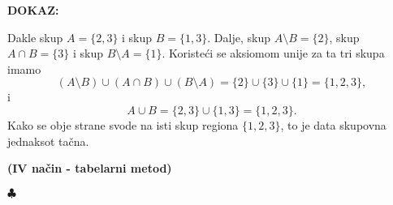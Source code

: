 \documentclass{article}
\newenvironment{dokaz}
    {\noindent\textbf{DOKAZ:}\\} {\hfill $\clubsuit$}
\begin{document}
\begin{dokaz}
    \begin{figure}[h]
         \hskip 2cm
        \end{figure}
    
    \noindent
    Dakle skup $A=\{2, 3\}$ i skup $B=\{1, 3\}$. Dalje, skup $A\setminus B=\{2\}$, skup $A\cap B=\{3\}$ i skup $B\setminus A=\{1\}$. Koristeći se aksiomom unije za ta tri skupa imamo
    $$(A\setminus B)\cup (A\cap B)\cup (B\setminus A)=\{2\}\cup \{3\}\cup \{1\}=\{1, 2, 3\},$$
    i
    $$A\cup B=\{2, 3\}\cup \{1, 3\}=\{1, 2, 3\}.$$
    Kako se obje strane svode na isti skup regiona $\{1, 2, 3\}$, to je data skupovna jednaksot tačna.\\
    \smallskip

    \noindent
    \textbf{(IV način - tabelarni metod)}\\
    \smallskip


\end{dokaz}
\end{document}
